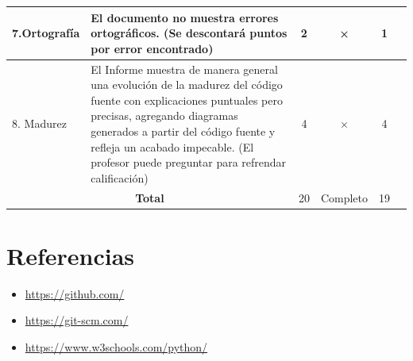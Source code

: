 \documentclass{article}
\begin{document}
\begin{table}[H]
\begin{tabular}{|p{2cm}|p{6cm}|c|c|c|c|}
		7.Ortografía                                            & El documento no muestra errores ortográficos. (Se descontará puntos por error encontrado)                                                                                                                                                                                        & 2                  & ×                   & 1                 & \\ \hline
		8. Madurez                                              & El Informe muestra de manera general una evolución de la madurez del código fuente con explicaciones puntuales pero precisas, agregando diagramas generados a partir del código fuente y refleja un acabado impecable. (El profesor puede preguntar para refrendar calificación) & 4                  & ×                   & 4                 & \\ \hline
		\multicolumn{2}{|c|}{\textbf{Total}}                    & 20                                                                                                                                                                                                                                                                               & Completo           & 19                  &                     \\ \hline
	\end{tabular}
\end{table}

\section{Referencias}
\begin{itemize}
	\item \url{https://github.com/}
	\item \url{https://git-scm.com/}
	\item \url{https://www.w3schools.com/python/}
\end{itemize}

\pagebreak
\end{document}
